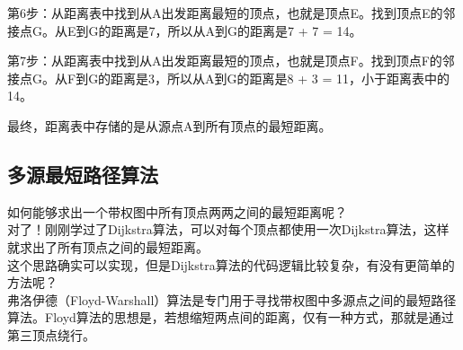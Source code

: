 第6步：从距离表中找到从A出发距离最短的顶点，也就是顶点E。找到顶点E的邻接点G。从E到G的距离是7，所以从A到G的距离是7 + 7 = 14。

\begin{table}[H]
	\centering
\end{table}

第7步：从距离表中找到从A出发距离最短的顶点，也就是顶点F。找到顶点F的邻接点G。从F到G的距离是3，所以从A到G的距离是8 + 3 = 11，小于距离表中的14。

\begin{table}[H]
	\centering
\end{table}

最终，距离表中存储的是从源点A到所有顶点的最短距离。\\

\subsection{多源最短路径算法}

如何能够求出一个带权图中所有顶点两两之间的最短距离呢？\\

对了！刚刚学过了Dijkstra算法，可以对每个顶点都使用一次Dijkstra算法，这样就求出了所有顶点之间的最短距离。\\

这个思路确实可以实现，但是Dijkstra算法的代码逻辑比较复杂，有没有更简单的方法呢？\\

弗洛伊德（Floyd-Warshall）算法是专门用于寻找带权图中多源点之间的最短路径算法。Floyd算法的思想是，若想缩短两点间的距离，仅有一种方式，那就是通过第三顶点绕行。\\

